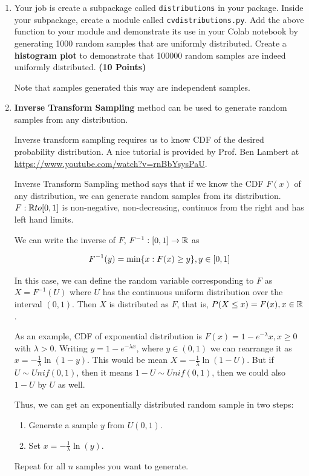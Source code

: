 \documentclass[12pt, xcolor=dvipsnames,svgnames,x11names]{article}
\makeatletter
\newenvironment{multiequation}[1][]{%
\begin{equation}%
   \begin{aligned}%
   \ifx#1\@empty\else\label{#1}\fi%
}{%
   \end{aligned}%
\end{equation}%
}
\makeatother
\begin{document}
\begin{enumerate}
\item Your job is create a subpackage called \texttt{distributions} in your package. Inside your subpackage, create a module called \texttt{cvdistributions.py}. Add the above function to your module and demonstrate its use in your Colab notebook by generating 1000 random samples that are uniformly distributed. Create a \textbf{histogram plot} to demonstrate that 100000 random samples are indeed uniformly distributed. \textbf{(10 Points)}

Note that samples generated this way are independent samples.

\item \textbf{Inverse Transform Sampling} method can be used to generate random samples from any distribution.

Inverse transform sampling requires us to know CDF of the desired probability distribution. A nice tutorial is provided by Prof. Ben Lambert at \url{https://www.youtube.com/watch?v=rnBbYsysPaU}.

Inverse Transform Sampling method says that if we know the CDF $F(x)$ of any distribution, we can generate random samples from its distribution. $F: {\mathbb R} to [0,1]$ is non-negative, non-decreasing, continuos from the right and has left hand limits. 

We can write the inverse of $F$, $F^{-1}: [0, 1] \to {\mathbb R}$ as 

\begin{multiequation}
F^{-1}(y) = \min\{x: F(x) \geq y \}, y \in [0, 1]
\end{multiequation}

In this case, we can define the random variable corresponding to $F$ as $X = F^{-1}(U)$ where $U$ has the continuous uniform distribution over the interval $(0,1)$. Then $X$ is distributed as $F$, that is, $P(X\leq x) = F(x), x\in {\mathbb R}$.

As an example, CDF of exponential distribution is $F(x) = 1-e^{-\lambda} x, x\geq 0$ with $\lambda >0$. Writing $y = 1 - e^{-\lambda  x}$, where $y\in (0, 1)$ we can rearrange it as $x = -\frac{1}{\lambda}\ln(1-y)$. This would be mean $X = -\frac{1}{\lambda}\ln(1-U)$. But if $U\sim Unif(0,1)$, then it means $1-U \sim Unif(0,1)$, then we could also $1-U$ by $U$ as well. 

Thus, we can get an exponentially distributed random sample in two steps:

\begin{enumerate}
\item Generate a sample $y$ from $U(0,1)$.
\item Set $x = -\frac{1}{\lambda}\ln(y)$.
\end{enumerate}
Repeat for all $n$ samples you want to generate.


\end{enumerate}
\end{document}
